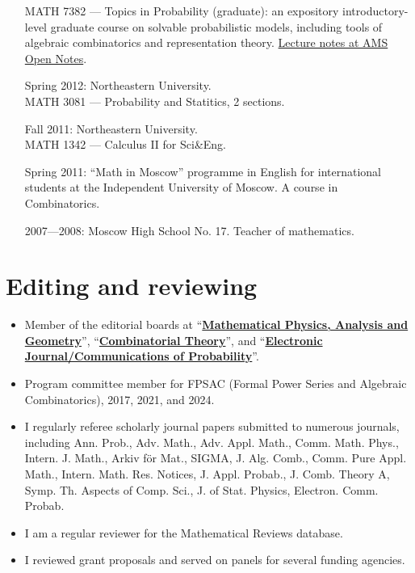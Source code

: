 \documentclass[letterpaper,11pt]{article}
\begin{document}
\begin{itemize}
	      MATH 7382 --- Topics in Probability (graduate): an expository
	      introductory-level graduate course on solvable probabilistic models, including
	      tools of algebraic combinatorics and representation theory.
		  \href{https://www.ams.org/open-math-notes/omn-view-listing?listingId=110813}{Lecture notes at AMS Open Notes}.

	\item
	      [Spring 2012:]
	      Northeastern University. \\ MATH 3081 --- Probability and
	      Statitics, 2 sections.
	\item
	      [Fall 2011:]
	      Northeastern University.\\ MATH 1342 --- Calculus II for
	      Sci\&Eng.
	\item
	      [Spring 2011:]
	      ``Math in Moscow'' programme in English for international
	      students at the Independent University of Moscow. A course in
	      Combinatorics.

	\item
	      [2007---2008:]
	      Moscow High School No. 17. Teacher of mathematics.
\end{itemize}

\section*{Editing and reviewing}

\begin{itemize}
	\item
	Member of the editorial boards at ``\href{https://www.springer.com/journal/11040}{\textbf{Mathematical Physics, Analysis and Geometry}}'', ``\href{https://escholarship.org/uc/combinatorial_theory/}{\textbf{Combinatorial Theory}}'', and ``\href{https://imstat.org/journals-and-publications/electronic-journal-of-probability/}{\textbf{Electronic Journal/Communications of Probability}}''.
	\item Program committee member for FPSAC (Formal Power Series and Algebraic Combinatorics),
		2017, 2021, and 2024.
	\item
	I regularly referee scholarly journal papers submitted to numerous journals,
	including
	Ann. Prob., Adv. Math., Adv. Appl. Math., Comm. Math. Phys., Intern. J. Math.,
	Arkiv f\"or Mat., SIGMA, J. Alg. Comb., Comm. Pure Appl. Math., Intern. Math.
	Res. Notices, J. Appl. Probab., J. Comb. Theory A, Symp. Th. Aspects of Comp.
	Sci., J. of Stat. Physics, Electron. Comm. Probab.
	\item
	I am a regular
	reviewer for the Mathematical Reviews database.
	\item
	I reviewed grant proposals and served on panels for several funding agencies.
\end{itemize}
\end{document}

